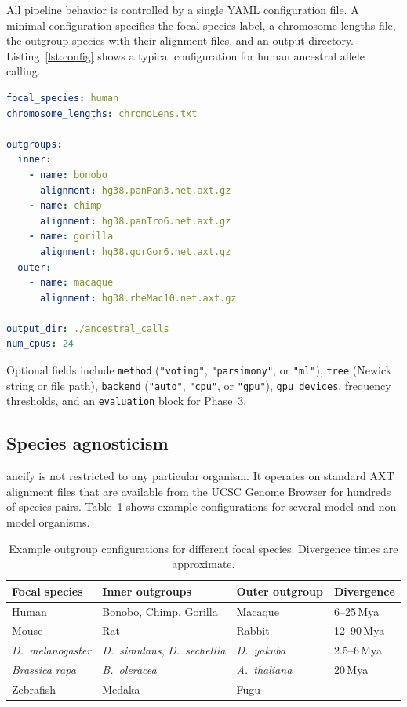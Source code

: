 \documentclass[11pt,a4paper]{article}
\begin{document}
All pipeline behavior is controlled by a single YAML configuration file.
A minimal configuration specifies the focal species label, a chromosome
lengths file, the outgroup species with their alignment files, and an output
directory. Listing~\ref{lst:config} shows a typical configuration for human
ancestral allele calling.

\begin{lstlisting}[language=yaml,caption={Minimal YAML configuration for
human (hg38) ancestral calling with four outgroups.},
label={lst:config}]
focal_species: human
chromosome_lengths: chromoLens.txt

outgroups:
  inner:
    - name: bonobo
      alignment: hg38.panPan3.net.axt.gz
    - name: chimp
      alignment: hg38.panTro6.net.axt.gz
    - name: gorilla
      alignment: hg38.gorGor6.net.axt.gz
  outer:
    - name: macaque
      alignment: hg38.rheMac10.net.axt.gz

output_dir: ./ancestral_calls
num_cpus: 24
\end{lstlisting}

Optional fields include \texttt{method} (\texttt{"voting"},
\texttt{"parsimony"}, or \texttt{"ml"}), \texttt{tree} (Newick string or
file path), \texttt{backend} (\texttt{"auto"}, \texttt{"cpu"}, or
\texttt{"gpu"}), \texttt{gpu\_devices}, frequency thresholds, and an
\texttt{evaluation} block for Phase~3.

\subsection{Species agnosticism}
\label{sec:species}

ancify is not restricted to any particular organism. It operates on standard
AXT alignment files that are available from the UCSC Genome Browser for
hundreds of species pairs. Table~\ref{tab:species} shows example
configurations for several model and non-model organisms.

\begin{table}[t]
\centering
\caption{Example outgroup configurations for different focal species.
Divergence times are approximate.}
\label{tab:species}
\begin{tabular}{@{}llll@{}}
\toprule
Focal species & Inner outgroups & Outer outgroup & Divergence \\
\midrule
Human & Bonobo, Chimp, Gorilla & Macaque & 6--25\,Mya \\
Mouse & Rat & Rabbit & 12--90\,Mya \\
\textit{D.~melanogaster} & \textit{D.~simulans}, \textit{D.~sechellia} & \textit{D.~yakuba} & 2.5--6\,Mya \\
\textit{Brassica rapa} & \textit{B.~oleracea} & \textit{A.~thaliana} & 20\,Mya \\
Zebrafish & Medaka & Fugu & --- \\
\bottomrule
\end{tabular}
\end{table}
\end{document}
